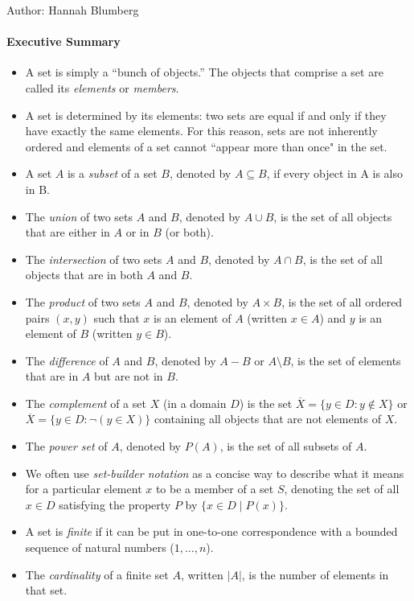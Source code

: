 \documentclass[solution, letterpaper]{cs20inclass}
\begin{document}

\noindent Author: Hannah Blumberg

\paragraph*{Executive Summary}

\begin{itemize}
  \item A set is simply a ``bunch of objects.'' The objects that comprise a set are called its {\it elements} or {\it members}.
  \item A set is determined by its elements: two sets are equal if and only if they have exactly the same elements. For this reason, sets are not inherently ordered and elements of a set cannot ``appear more than once" in the set.
  \item A set $A$ is a {\em subset} of a set $B$, denoted by $A \subseteq B$, if every object in A is also in B.
  \item The {\em union} of two sets $A$ and $B$, denoted by $A\cup B$, is the set of all objects that are either in $A$ or in $B$ (or both).
  \item The {\em intersection} of two sets $A$ and $B$, denoted by $A \cap B$, is the set of all objects that are in both $A$ and $B$.
  \item The {\em product} of two sets $A$ and $B$, denoted by $A\times B$, is the set of all ordered pairs $(x,y)$ such that $x$ is an element of $A$ (written $x \in A$) and $y$ is an element of $B$ (written $y \in B$).
  \item The {\em difference} of $A$ and $B$, denoted by $A-B$ or $A\setminus B$, is the set of elements that are in $A$ but are not in $B$.
  \item The {\em complement} of a set $X$ (in a domain $D$) is the set $\overline X = \{y \in D : y \notin X\}$ or $\overline X = \{y \in D : \neg (y \in X)\}$ containing all objects that are not elements of $X$.
  \item The {\em power set} of $A$, denoted by $P(A)$, is the set of all subsets of $A$.
  \item We often use {\em set-builder notation} as a concise way to describe what it means for a particular element $x$ to be a member of a set $S$, denoting the set of all $x\in D$ satisfying the property $P$ by $\{x\in D\mid P(x)\}$.
  \item A set is {\em finite} if it can be put in one-to-one correspondence with a bounded sequence of natural numbers ($1,\dots,n$). 
  \item The {\em cardinality} of a finite set $A$, written $|A|$, is the number of elements in that set.
\end{itemize}
\end{document}
